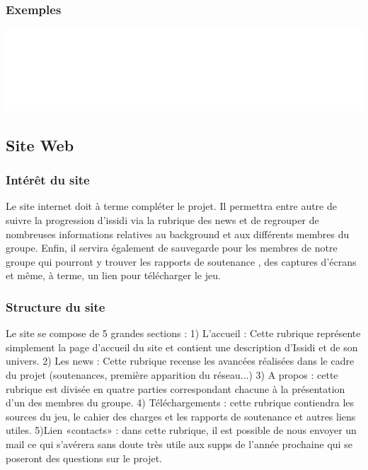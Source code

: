 ﻿\documentclass{article}
\begin{document}
\subsubsection{Exemples}
\centerline{\includegraphics[scale=0.2]{latex_sa_pue.png}}





\subsection{Site Web}
	\subsubsection{Intérêt du site}
 Le site internet doit à terme compléter le projet. Il permettra entre autre de suivre la progression d'issidi  via la rubrique des news et  de regrouper de nombreuses informations relatives au background et aux différents membres du groupe. Enfin, il servira également de sauvegarde pour les membres de notre groupe qui pourront y trouver les rapports de soutenance , des captures d'écrans et même, à terme, un lien pour télécharger le jeu.
 
	\subsubsection{Structure du site}
	Le site se compose de 5 grandes sections : 
1) L’accueil : Cette rubrique
 représente simplement la page d’accueil du site et contient une description d'Issidi et de son univers. 
 2) Les news : Cette rubrique recense les avancées réalisées dans le cadre du projet
(soutenances, première apparition du réseau...)
 3) A propos : cette rubrique est
 divisée en quatre parties correspondant chacune à la présentation d’un des membres du groupe. 
 4) Téléchargements : cette rubrique contiendra les sources du jeu, le cahier des charges et les rapports de soutenance et autres liens utiles. 
 5)Lien «contacts» : dans cette rubrique, il est possible de nous envoyer un mail ce qui s'avérera sans doute très utile aux supps  de l'année prochaine qui se poseront des questions sur le projet.
 
\end{document}
